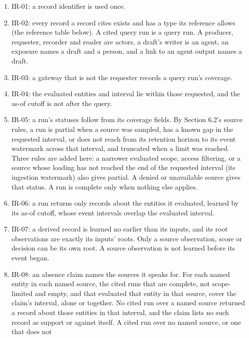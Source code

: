 \documentclass[
  11pt,
]{article}
\providecommand{\tightlist}{%
  \setlength{\itemsep}{0pt}\setlength{\parskip}{0pt}}
\renewcommand{\tightlist}{\setlength{\itemsep}{0pt plus 1pt}\setlength{\parskip}{0pt}}
\begin{document}
\begin{enumerate}
\def\labelenumi{\arabic{enumi}.}
\tightlist
\item
  \mbox{IR-01}: a record identifier is used once.
\item
  \mbox{IR-02}: every record a record cites exists and has a type its
  reference allows (the reference table below). A cited query run is a
  query run. A producer, requester, recorder and reader are actors, a
  draft's writer is an agent, an exposure names a draft and a person,
  and a link to an agent output names a draft.
\item
  \mbox{IR-03}: a gateway that is not the requester records a query
  run's coverage.
\item
  \mbox{IR-04}: the evaluated entities and interval lie within those
  requested, and the as-of cutoff is not after the query.
\item
  \mbox{IR-05}: a run's statuses follow from its coverage fields. By
  Section 6.2's source rules, a run is partial when a source was
  sampled, has a known gap in the requested interval, or does not reach
  from its retention horizon to its event watermark across that
  interval, and truncated when a limit was reached. Three rules are
  added here: a narrower evaluated scope, access filtering, or a source
  whose loading has not reached the end of the requested interval (its
  ingestion watermark) also gives partial. A denied or unavailable
  source gives that status. A run is complete only when nothing else
  applies.
\item
  \mbox{IR-06}: a run returns only records about the entities it
  evaluated, learned by its as-of cutoff, whose event intervals overlap
  the evaluated interval.
\item
  \mbox{IR-07}: a derived record is learned no earlier than its inputs,
  and its root observations are exactly its inputs' roots. Only a source
  observation, score or decision can be its own root. A source
  observation is not learned before its event began.
\item
  \mbox{IR-08}: an absence claim names the sources it speaks for. For
  each named entity in each named source, the cited runs that are
  complete, not scope-limited and empty, and that evaluated that entity
  in that source, cover the claim's interval, alone or together. No
  cited run over a named source returned a record about those entities
  in that interval, and the claim lists no such record as support or
  against itself. A cited run over no named source, or one that does not

\end{enumerate}
\end{document}
